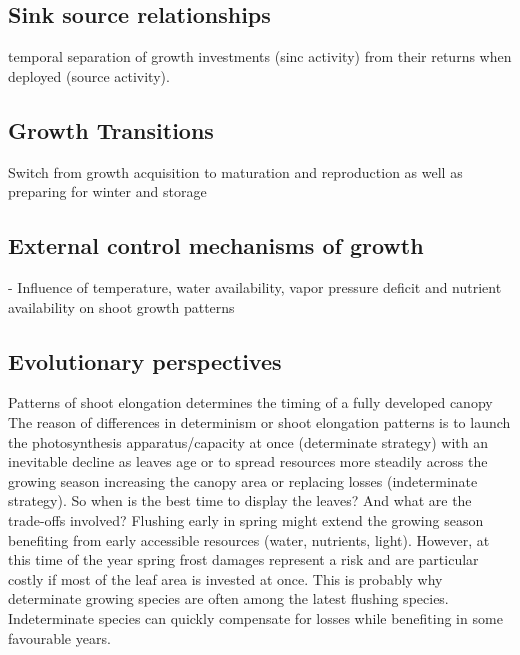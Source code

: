 \documentclass{article}
\begin{document}
	\subsection*{Sink source relationships}
	temporal separation of growth investments (sinc activity) from their returns when deployed (source activity). \\
	
	\subsection*{Growth Transitions}
	Switch from growth acquisition to maturation and reproduction as well as preparing for winter and storage\\
	
	
	\subsection*{External control mechanisms of growth}
	- Influence of temperature, water availability, vapor pressure deficit and nutrient availability on shoot growth patterns\\
	
	\subsection*{Evolutionary perspectives}
	Patterns of shoot elongation determines the timing of a fully developed canopy\\
	The reason of differences in determinism or shoot elongation patterns is to launch the photosynthesis apparatus/capacity at once (determinate strategy) with an inevitable decline as leaves age or to spread resources more steadily across the growing season increasing the canopy area or replacing losses (indeterminate strategy). So when is the best time to display the leaves? And what are the trade-offs involved? Flushing early in spring might extend the growing season benefiting from early accessible resources (water, nutrients, light). However, at this time of the year spring frost damages represent a risk and are particular costly if most of the leaf area is invested at once. This is probably why determinate growing species are often among the latest flushing species. Indeterminate species can quickly compensate for losses while benefiting in some favourable years. \\
	
\end{document}

